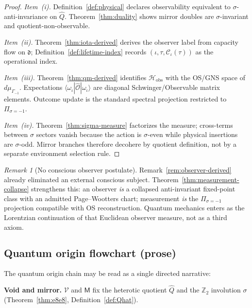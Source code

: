 \documentclass[aps,prd,onecolumn,amsmath,amssymb,nofootinbib,11pt]{revtex4-2}
\numberwithin{equation}{section}
\theoremstyle{plain}
\theoremstyle{definition}
\theoremstyle{remark}
\newtheorem{remark}[theorem]{Remark}
\newcommand{\Void}{\mathcal{V}}
\newcommand{\Mirror}{\mathsf{M}}
\newcommand{\capacity}{\mathcal{C}}
\begin{document}
\begin{proof}
\emph{Item~(i).} Definition~\ref{def:physical} declares observability
equivalent to $\sigma$-anti-invariance on $\hat Q$. Theorem~\ref{thm:duality}
shows mirror doubles are $\sigma$-invariant and quotient-non-observable.

\emph{Item~(ii).} Theorem~\ref{thm:iota-derived} derives the observer label
from capacity flow on $\mathfrak{d}$; Definition~\ref{def:lifetime-index}
records $(\iota,\tau,\capacity_\iota(\tau))$ as the operational index.

\emph{Item~(iii).} Theorem~\ref{thm:qm-derived} identifies
$\mathcal{H}_{\mathrm{obs}}$ with the OS/GNS space of
$d\mu_{\Gamma_{-1}}$. Expectations $\langle\omega_\iota|\hat{\mathcal{O}}|\omega_\iota\rangle$
are diagonal Schwinger/Observable matrix elements. Outcome update is the
standard spectral projection restricted to $\Pi_{\sigma=-1}$.

\emph{Item~(iv).} Theorem~\ref{thm:sigma-measure} factorizes the measure;
cross-terms between $\sigma$ sectors vanish because the action is
$\sigma$-even while physical insertions are $\sigma$-odd. Mirror branches
therefore decohere by quotient definition, not by a separate environment
selection rule.
\end{proof}

\begin{remark}[No conscious observer postulate]
Remark~\ref{rem:observer-derived} already eliminated an external conscious
subject. Theorem~\ref{thm:measurement-collapse} strengthens this: an observer
\emph{is} a collapsed anti-invariant fixed-point class with an admitted
Page--Wootters chart; measurement \emph{is} the $\Pi_{\sigma=-1}$ projection
compatible with OS reconstruction. Quantum mechanics enters as the
Lorentzian continuation of that Euclidean observer measure, not as a third
axiom.
\end{remark}

\subsection{Quantum origin flowchart (prose)}

The quantum origin chain may be read as a single directed narrative:

\medskip
\noindent\textbf{Void and mirror.}
$\Void$ and $\Mirror$ fix the heterotic quotient $\hat Q$ and the
$\mathbb{Z}_2$ involution $\sigma$ (Theorem~\ref{thm:e8e8},
Definition~\ref{def:Qhat}).
\end{document}
